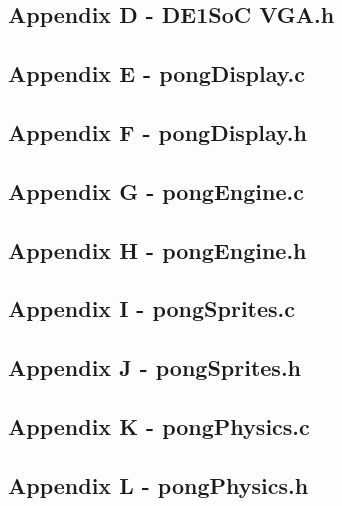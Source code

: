 \documentclass[a4paper,12pt]{article}
\begin{document}
\subsection{Appendix D - DE1SoC VGA.h}

\newpage
\subsection{Appendix E - pongDisplay.c}

\newpage
\subsection{Appendix F - pongDisplay.h}

\newpage
\subsection{Appendix G - pongEngine.c}

\newpage
\subsection{Appendix H - pongEngine.h}

\newpage
\subsection{Appendix I - pongSprites.c}

\newpage
\subsection{Appendix J - pongSprites.h}

\newpage
\subsection{Appendix K - pongPhysics.c}

\newpage
\subsection{Appendix L - pongPhysics.h}

\newpage
\end{document}
